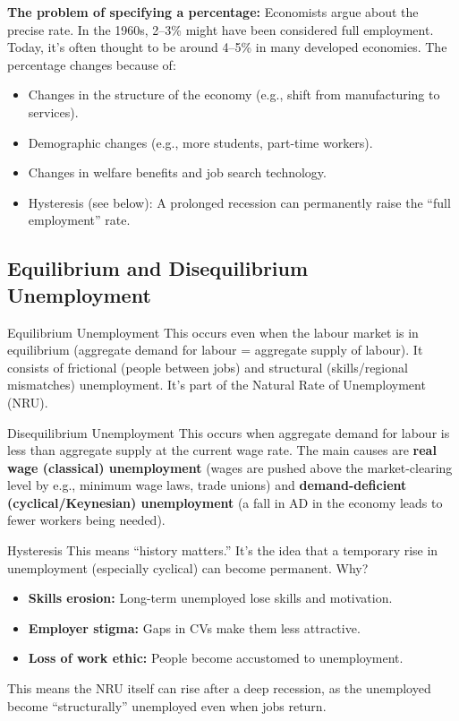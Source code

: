 \documentclass[11pt, a4paper, twoside]{book}
\begin{document}
\textbf{The problem of specifying a percentage:} Economists argue about the precise rate. In the 1960s, 2--3\% might have been considered full employment. Today, it's often thought to be around 4--5\% in many developed economies. The percentage changes because of:
\begin{itemize}
  \item Changes in the structure of the economy (e.g., shift from manufacturing to services).
  \item Demographic changes (e.g., more students, part-time workers).
  \item Changes in welfare benefits and job search technology.
  \item Hysteresis (see below): A prolonged recession can permanently raise the ``full employment'' rate.
\end{itemize}

\subsection{Equilibrium and Disequilibrium Unemployment}

\begin{keyterm}{Equilibrium Unemployment}
This occurs even when the labour market is in equilibrium (aggregate demand for labour = aggregate supply of labour). It consists of frictional (people between jobs) and structural (skills/regional mismatches) unemployment. It's part of the Natural Rate of Unemployment (NRU).
\end{keyterm}

\begin{keyterm}{Disequilibrium Unemployment}
This occurs when aggregate demand for labour is less than aggregate supply at the current wage rate. The main causes are \textbf{real wage (classical) unemployment} (wages are pushed above the market-clearing level by e.g., minimum wage laws, trade unions) and \textbf{demand-deficient (cyclical/Keynesian) unemployment} (a fall in AD in the economy leads to fewer workers being needed).
\end{keyterm}

\begin{keyterm}{Hysteresis}
This means ``history matters.'' It's the idea that a temporary rise in unemployment (especially cyclical) can become permanent. Why?
\begin{itemize}
  \item \textbf{Skills erosion:} Long-term unemployed lose skills and motivation.
  \item \textbf{Employer stigma:} Gaps in CVs make them less attractive.
  \item \textbf{Loss of work ethic:} People become accustomed to unemployment.
\end{itemize}
This means the NRU itself can rise after a deep recession, as the unemployed become ``structurally'' unemployed even when jobs return.
\end{keyterm}
\end{document}
